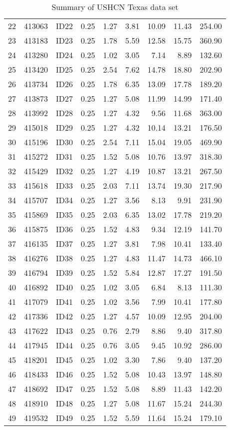 \documentclass[12pt]{article}\usepackage[]{graphicx}\usepackage[]{color}
\begin{document}
\begin{table}[ht]
{\begin{tabular}{rllrrrrrr}
  22 & 413063 & ID22 & 0.25 & 1.27 & 3.81 & 10.09 & 11.43 & 254.00 \\ 
  23 & 413183 & ID23 & 0.25 & 1.78 & 5.59 & 12.58 & 15.75 & 360.90 \\ 
  24 & 413280 & ID24 & 0.25 & 1.02 & 3.05 & 7.14 & 8.89 & 132.60 \\ 
  25 & 413420 & ID25 & 0.25 & 2.54 & 7.62 & 14.78 & 18.80 & 202.90 \\ 
  26 & 413734 & ID26 & 0.25 & 1.78 & 6.35 & 13.09 & 17.78 & 189.20 \\ 
  27 & 413873 & ID27 & 0.25 & 1.27 & 5.08 & 11.99 & 14.99 & 171.40 \\ 
  28 & 413992 & ID28 & 0.25 & 1.27 & 4.32 & 9.56 & 11.68 & 363.00 \\ 
  29 & 415018 & ID29 & 0.25 & 1.27 & 4.32 & 10.14 & 13.21 & 176.50 \\ 
  30 & 415196 & ID30 & 0.25 & 2.54 & 7.11 & 15.04 & 19.05 & 469.90 \\ 
  31 & 415272 & ID31 & 0.25 & 1.52 & 5.08 & 10.76 & 13.97 & 318.30 \\ 
  32 & 415429 & ID32 & 0.25 & 1.27 & 4.19 & 10.87 & 13.21 & 267.50 \\ 
  33 & 415618 & ID33 & 0.25 & 2.03 & 7.11 & 13.74 & 19.30 & 217.90 \\ 
  34 & 415707 & ID34 & 0.25 & 1.27 & 3.56 & 8.13 & 9.91 & 231.90 \\ 
  35 & 415869 & ID35 & 0.25 & 2.03 & 6.35 & 13.02 & 17.78 & 219.20 \\ 
  36 & 415875 & ID36 & 0.25 & 1.52 & 4.83 & 9.34 & 12.19 & 141.70 \\ 
  37 & 416135 & ID37 & 0.25 & 1.27 & 3.81 & 7.98 & 10.41 & 133.40 \\ 
  38 & 416276 & ID38 & 0.25 & 1.27 & 4.83 & 11.47 & 14.73 & 466.10 \\ 
  39 & 416794 & ID39 & 0.25 & 1.52 & 5.84 & 12.87 & 17.27 & 191.50 \\ 
  40 & 416892 & ID40 & 0.25 & 1.02 & 3.05 & 6.84 & 8.13 & 111.30 \\ 
  41 & 417079 & ID41 & 0.25 & 1.02 & 3.56 & 7.99 & 10.41 & 177.80 \\ 
  42 & 417336 & ID42 & 0.25 & 1.27 & 4.57 & 10.09 & 12.95 & 204.00 \\ 
  43 & 417622 & ID43 & 0.25 & 0.76 & 2.79 & 8.86 & 9.40 & 317.80 \\ 
  44 & 417945 & ID44 & 0.25 & 0.76 & 3.05 & 9.45 & 10.92 & 286.00 \\ 
  45 & 418201 & ID45 & 0.25 & 1.02 & 3.30 & 7.86 & 9.40 & 137.20 \\ 
  46 & 418433 & ID46 & 0.25 & 1.52 & 5.08 & 10.43 & 13.97 & 148.80 \\ 
  47 & 418692 & ID47 & 0.25 & 1.52 & 5.08 & 8.89 & 11.43 & 142.20 \\ 
  48 & 418910 & ID48 & 0.25 & 1.27 & 5.08 & 11.67 & 15.24 & 244.30 \\ 
  49 & 419532 & ID49 & 0.25 & 1.52 & 5.59 & 11.64 & 15.24 & 179.10 \\ 
   \bottomrule
\end{tabular}
}
\caption{Summary of USHCN Texas data set} 
\end{table}
\end{document}

